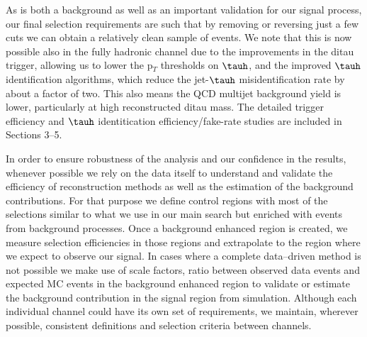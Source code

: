 As \zditau is both a background as well as an important validation for our signal process, our final selection requirements are such that by removing or
reversing just a few cuts we can obtain a relatively clean sample of \zditau events. We note that this is now possible also in the fully hadronic channel due 
to the improvements in the ditau trigger, allowing us to lower the p$_{T}$ thresholds on $\tauh$, and the improved $\tauh$ identification algorithms, which reduce the jet-$\tauh$ misidentification 
rate by about a factor of two. This also means the QCD multijet background yield is lower, particularly at high reconstructed ditau mass. The detailed trigger efficiency and $\tauh$ identitication 
efficiency/fake-rate studies are included in Sections 3--5. 

In order to ensure robustness of 
the analysis and our confidence in the results, whenever possible we rely on the data itself to understand and validate the efficiency of reconstruction
methods as well as the estimation of the background contributions. For that purpose we define control regions with most of the
selections similar to what we use in our main search but enriched with events from background processes. Once a background enhanced
region is created, we measure selection efficiencies in those regions and  extrapolate to the region  where we expect to observe our
signal. In cases where a complete data--driven method is not possible we make use of scale factors, ratio between observed data events
and expected MC events in the background enhanced region to validate or estimate the background  contribution in the signal region from simulation. Although each
individual channel could have its own set of requirements, we maintain, wherever possible, consistent definitions and selection
criteria  between channels. 

